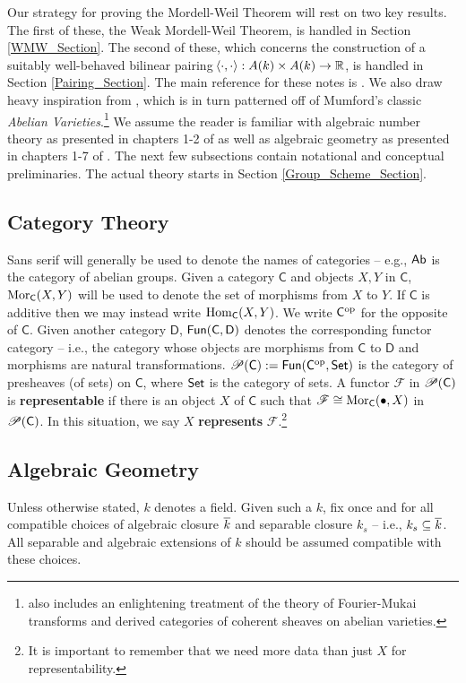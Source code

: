 \documentclass[11pt]{article}
\newcommand{\F}{\mathscr{F}}
\begin{document}
Our strategy for proving the Mordell-Weil Theorem will rest on two key results. The first of these, the Weak Mordell-Weil Theorem, is handled in Section \ref{WMW_Section}. The second of these, which concerns the construction of a suitably well-behaved bilinear pairing $\!\left\langle\cdot,\cdot\right\rangle: A(k)\times A(k)\to\mathbb{R}$, is handled in Section \ref{Pairing_Section}. The main reference for these notes is \cite{Conrad}. We also draw heavy inspiration from \cite{Bhatt}, which is in turn patterned off of Mumford's classic \textit{Abelian Varieties}.\footnote{\cite{Bhatt} also includes an enlightening treatment of the theory of Fourier-Mukai transforms and derived categories of coherent sheaves on abelian varieties.} We assume the reader is familiar with algebraic number theory as presented in chapters 1-2 of \cite{Neukirch} as well as algebraic geometry as presented in chapters 1-7 of \cite{Liu}. The next few subsections contain notational and conceptual preliminaries. The actual theory starts in Section \ref{Group_Scheme_Section}.

\subsection{Category Theory}
Sans serif will generally be used to denote the names of categories -- e.g., $\operatorname{\mathsf{Ab}}$ is the category of abelian groups. Given a category $\mathsf{C}$ and objects $X,Y$ in $\mathsf{C}$, $\operatorname{Mor}_{\mathsf{C}}(X,Y)$ will be used to denote the set of morphisms from $X$ to $Y$. If $\mathsf{C}$ is additive then we may instead write $\operatorname{Hom}_{\mathsf{C}}(X,Y)$. We write $\mathsf{C}^{\operatorname{op}}$ for the opposite of $\mathsf{C}$. Given another category $\mathsf{D}$, $\operatorname{\mathsf{Fun}}(\mathsf{C},\mathsf{D})$ denotes the corresponding functor category -- i.e., the category whose objects are morphisms from $\mathsf{C}$ to $\mathsf{D}$ and morphisms are natural transformations. $\mathscr{P}(\mathsf{C}):=\operatorname{\mathsf{Fun}}(\mathsf{C}^{\operatorname{op}},\operatorname{\mathsf{Set}})$ is the category of presheaves (of sets) on $\mathsf{C}$, where $\operatorname{\mathsf{Set}}$ is the category of sets. A functor $\F$ in $\mathscr{P}(\mathsf{C})$ is \textbf{representable} if there is an object $X$ of $\mathsf{C}$ such that $\F\iso\Mor_{\mathsf{C}}(\bullet,X)$ in $\mathscr{P}(\mathsf{C})$. In this situation, we say $X$ \textbf{represents} $\F$.\footnote{It is important to remember that we need more data than just $X$ for representability.}

\subsection{Algebraic Geometry}
Unless otherwise stated, $k$ denotes a field. Given such a $k$, fix once and for all compatible choices of algebraic closure $\overline{k}$ and separable closure $k_s$ -- i.e., $k_s\subseteq\overline{k}$. All separable and algebraic extensions of $k$ should be assumed compatible with these choices.
\end{document}
